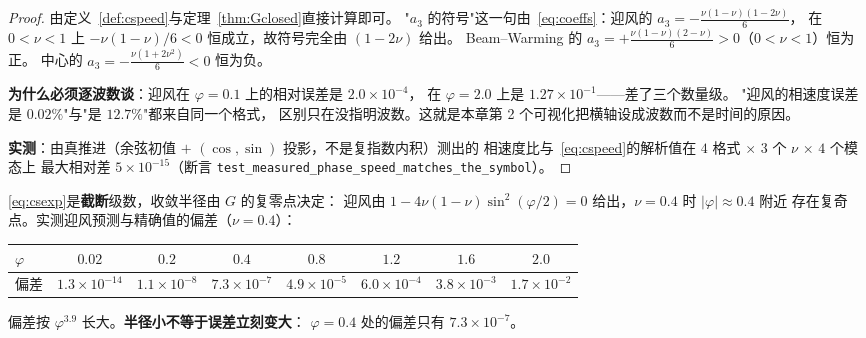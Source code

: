 \begin{proof}
由定义~\ref{def:cspeed}与定理~\ref{thm:Gclosed}直接计算即可。
"$a_3$ 的符号"这一句由~\eqref{eq:coeffs}：迎风的 $a_3=-\tfrac{\nu(1-\nu)(1-2\nu)}{6}$，
在 $0<\nu<1$ 上 $-\nu(1-\nu)/6<0$ 恒成立，故符号完全由 $(1-2\nu)$ 给出。
Beam--Warming 的 $a_3=+\tfrac{\nu(1-\nu)(2-\nu)}{6}>0$（$0<\nu<1$）恒为正。
中心的 $a_3=-\tfrac{\nu(1+2\nu^2)}{6}<0$ 恒为负。

\textbf{为什么必须逐波数谈}：迎风在 $\varphi=0.1$ 上的相对误差是 $2.0\times10^{-4}$，
在 $\varphi=2.0$ 上是 $1.27\times10^{-1}$——差了三个数量级。
"迎风的相速度误差是 $0.02\%$"与"是 $12.7\%$"都来自同一个格式，
区别只在没指明波数。这就是本章第 2 个可视化把横轴设成波数而不是时间的原因。

\textbf{实测}：由真推进（余弦初值 $+$ $(\cos,\sin)$ 投影，不是复指数内积）测出的
相速度比与~\eqref{eq:cspeed}的解析值在 $4$ 格式 $\times$ $3$ 个 $\nu$ $\times$ $4$ 个模态上
最大相对差 $5\times10^{-15}$（断言 \texttt{test\_measured\_phase\_speed\_matches\_the\_symbol}）。
\end{proof}

\begin{theorem}[预测的有效范围]
\label{thm:radius}
\eqref{eq:csexp}是\textbf{截断}级数，收敛半径由 $G$ 的复零点决定：
迎风由 $1-4\nu(1-\nu)\sin^2(\varphi/2)=0$ 给出，$\nu=0.4$ 时 $|\varphi|\approx0.4$ 附近
存在复奇点。实测迎风预测与精确值的偏差（$\nu=0.4$）：

\begin{center}
\begin{tabular}{lccccccc}
\hline
$\varphi$ & $0.02$ & $0.2$ & $0.4$ & $0.8$ & $1.2$ & $1.6$ & $2.0$\\
\hline
偏差 & $1.3\times10^{-14}$ & $1.1\times10^{-8}$ & $7.3\times10^{-7}$ & $4.9\times10^{-5}$
& $6.0\times10^{-4}$ & $3.8\times10^{-3}$ & $1.7\times10^{-2}$\\
\hline
\end{tabular}
\end{center}

偏差按 $\varphi^{3.9}$ 长大。\textbf{半径小不等于误差立刻变大}：
$\varphi=0.4$ 处的偏差只有 $7.3\times10^{-7}$。
\end{theorem}

